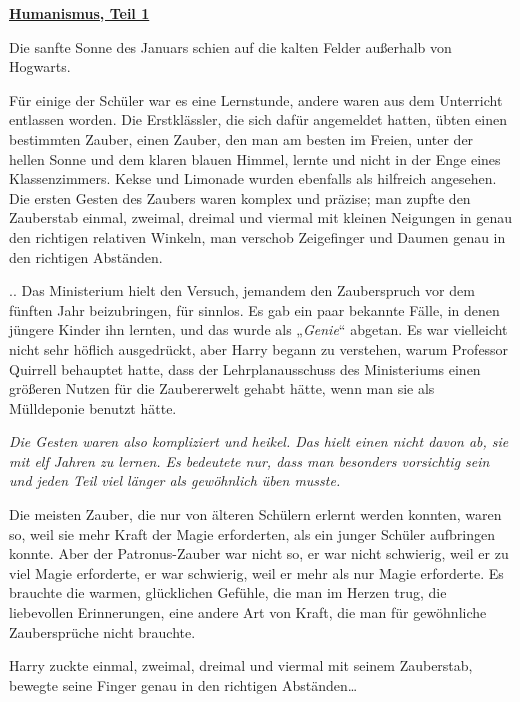 

\hypertarget{humanismus-teil-1}{%

\textbf{\uline{Humanismus, Teil 1}}

Die sanfte Sonne des Januars schien auf die kalten Felder außerhalb von Hogwarts.

Für einige der Schüler war es eine Lernstunde, andere waren aus dem Unterricht entlassen worden. Die Erstklässler, die sich dafür angemeldet hatten, übten einen bestimmten Zauber, einen Zauber, den man am besten im Freien, unter der hellen Sonne und dem klaren blauen Himmel, lernte und nicht in der Enge eines Klassenzimmers. Kekse und Limonade wurden ebenfalls als hilfreich angesehen. Die ersten Gesten des Zaubers waren komplex und präzise; man zupfte den Zauberstab einmal, zweimal, dreimal und viermal mit kleinen Neigungen in genau den richtigen relativen Winkeln, man verschob Zeigefinger und Daumen genau in den richtigen Abständen.

.. Das Ministerium hielt den Versuch, jemandem den Zauberspruch vor dem fünften Jahr beizubringen, für sinnlos. Es gab ein paar bekannte Fälle, in denen jüngere Kinder ihn lernten, und das wurde als „\emph{Genie}“ abgetan. Es war vielleicht nicht sehr höflich ausgedrückt, aber Harry begann zu verstehen, warum Professor Quirrell behauptet hatte, dass der Lehrplanausschuss des Ministeriums einen größeren Nutzen für die Zaubererwelt gehabt hätte, wenn man sie als Mülldeponie benutzt hätte.

\emph{Die Gesten waren also kompliziert und heikel. Das hielt einen nicht davon ab, sie mit elf Jahren zu lernen. Es bedeutete nur, dass man besonders vorsichtig sein und jeden Teil viel länger als gewöhnlich üben musste.}

Die meisten Zauber, die nur von älteren Schülern erlernt werden konnten, waren so, weil sie mehr Kraft der Magie erforderten, als ein junger Schüler aufbringen konnte. Aber der Patronus-Zauber war nicht so, er war nicht schwierig, weil er zu viel Magie erforderte, er war schwierig, weil er mehr als nur Magie erforderte. Es brauchte die warmen, glücklichen Gefühle, die man im Herzen trug, die liebevollen Erinnerungen, eine andere Art von Kraft, die man für gewöhnliche Zaubersprüche nicht brauchte.

Harry zuckte einmal, zweimal, dreimal und viermal mit seinem Zauberstab, bewegte seine Finger genau in den richtigen Abständen…

}
